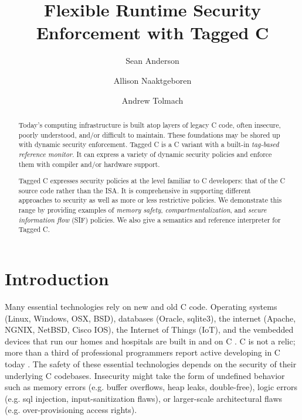 \documentclass{llncs}
\title{Flexible Runtime Security Enforcement with Tagged C}
\author{Sean Anderson \and Allison Naaktgeboren \and Andrew Tolmach}
\institute{Portland State University}
\begin{document}





\maketitle

\begin{abstract}
Today's computing infrastructure is built atop layers of legacy C code, often
insecure, poorly understood, and/or difficult to maintain.
These foundations may be shored up with dynamic security enforcement.
Tagged C is a C variant with a built-in {\em tag-based reference monitor}.
It can express a variety of dynamic security policies and enforce them with
compiler and/or hardware support.

Tagged C expresses security policies at the level familiar to C developers: that
of the C source code rather than the ISA. It is comprehensive in supporting different
approaches to security as well as more or less restrictive policies. We demonstrate
this range by providing examples of {\em memory safety}, {\em compartmentalization},
and {\em secure information flow} (SIF) policies. We also give a semantics and reference
interpreter for Tagged C.
\end{abstract}

\section{Introduction}
Many essential technologies rely on new and old C code. 
Operating systems (Linux, Windows, OSX, BSD), databases (Oracle, sqlite3), the internet
(Apache, NGNIX, NetBSD, Cisco IOS), the Internet of Things (IoT), and the 
vembedded devices that run our homes and hospitals are built in and on C \cite{Munoz:PoweredbyC}. 
C is not a relic; more than a third of professional programmers report active developing
in C today \cite{stackoverflow22:dev-survey}. 
The safety of these essential technologies
depends on the security of their underlying C codebases. Insecurity might take the form of
undefined behavior such as memory errors (e.g. buffer overflows, heap leaks, double-free),
logic errors (e.g. sql injection, input-sanitization flaws), or
larger-scale architectural flaws (e.g. over-provisioning access rights).
\end{document}
